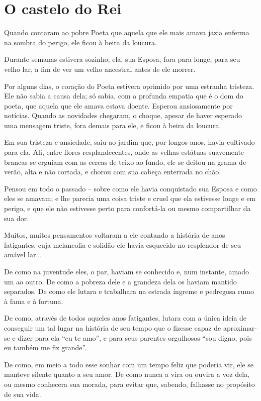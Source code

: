 \chapter{O castelo do Rei}

Quando contaram ao pobre Poeta que aquela que ele mais amava jazia
enferma na sombra do perigo, ele ficou à beira da loucura.

Durante semanas estivera sozinho; ela, sua Esposa, fora para longe, para
seu velho lar, a fim de ver um velho ancestral antes de ele morrer.

Por alguns dias, o coração do Poeta estivera oprimido por uma estranha
tristeza. Ele não sabia a causa dela; só sabia, com a profunda empatia
que é o dom do poeta, que aquela que ele amava estava doente. Esperou
ansiosamente por notícias. Quando as novidades chegaram, o choque,
apesar de haver esperado uma mensagem triste, fora demais para ele, e
ficou à beira da loucura.

Em sua tristeza e ansiedade, saiu ao jardim que, por longos anos, havia
cultivado para ela. Ali, entre flores resplandecentes, onde as velhas
estátuas suavemente brancas se erguiam com as cercas de teixo ao fundo,
ele se deitou na grama de verão, alta e não cortada, e chorou com sua
cabeça enterrada no chão.

Pensou em todo o passado -- sobre como ele havia conquistado sua Esposa
e como eles se amavam; e lhe parecia uma coisa triste e cruel que ela
estivesse longe e em perigo, e que ele não estivesse perto para
confortá-la ou mesmo compartilhar da sua dor.

Muitos, muitos pensamentos voltaram a ele contando a história de anos
fatigantes, cuja melancolia e solidão ele havia esquecido no resplendor
de seu amável lar...

De como na juventude eles, o par, haviam se conhecido e, num instante,
amado um ao outro. De como a pobreza dele e a grandeza dela os haviam
mantido separados. De como ele lutara e trabalhara na estrada íngreme e
pedregosa rumo à fama e à fortuna.

De como, através de todos aqueles anos fatigantes, lutara com a única
ideia de conseguir um tal lugar na história de seu tempo que o fizesse
capaz de aproximar-se e dizer para ela ``eu te amo'', e para seus
parentes orgulhosos ``sou digno, pois eu também me fiz grande''.

De como, em meio a todo esse sonhar com um tempo feliz que poderia vir,
ele se manteve silente quanto a seu amor. De como nunca a vira ou ouvira
a voz dela, ou mesmo conhecera sua morada, para evitar que, sabendo,
falhasse no propósito de sua vida.

